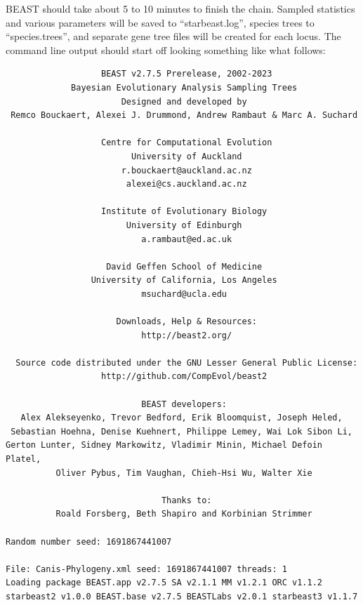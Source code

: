 \documentclass[12pt]{article}
\begin{document}
BEAST should take about 5 to 10 minutes to finish the chain. Sampled statistics
and various parameters will be saved to ``starbeast.log'', species trees to
``species.trees'', and separate gene tree files will be created for each locus. The command line
output should start off looking something like what follows:


\begin{verbatim}                   BEAST v2.7.5 Prerelease, 2002-2023
             Bayesian Evolutionary Analysis Sampling Trees
                       Designed and developed by
 Remco Bouckaert, Alexei J. Drummond, Andrew Rambaut & Marc A. Suchard
                                    
                   Centre for Computational Evolution
                         University of Auckland
                       r.bouckaert@auckland.ac.nz
                        alexei@cs.auckland.ac.nz
                                    
                   Institute of Evolutionary Biology
                        University of Edinburgh
                           a.rambaut@ed.ac.uk
                                    
                    David Geffen School of Medicine
                 University of California, Los Angeles
                           msuchard@ucla.edu
                                    
                      Downloads, Help & Resources:
                           http://beast2.org/
                                    
  Source code distributed under the GNU Lesser General Public License:
                   http://github.com/CompEvol/beast2
                                    
                           BEAST developers:
   Alex Alekseyenko, Trevor Bedford, Erik Bloomquist, Joseph Heled, 
 Sebastian Hoehna, Denise Kuehnert, Philippe Lemey, Wai Lok Sibon Li, 
Gerton Lunter, Sidney Markowitz, Vladimir Minin, Michael Defoin Platel, 
          Oliver Pybus, Tim Vaughan, Chieh-Hsi Wu, Walter Xie
                                    
                               Thanks to:
          Roald Forsberg, Beth Shapiro and Korbinian Strimmer

Random number seed: 1691867441007

File: Canis-Phylogeny.xml seed: 1691867441007 threads: 1
Loading package BEAST.app v2.7.5 SA v2.1.1 MM v1.2.1 ORC v1.1.2
starbeast2 v1.0.0 BEAST.base v2.7.5 BEASTLabs v2.0.1 starbeast3 v1.1.7\end{verbatim}
\end{document}

